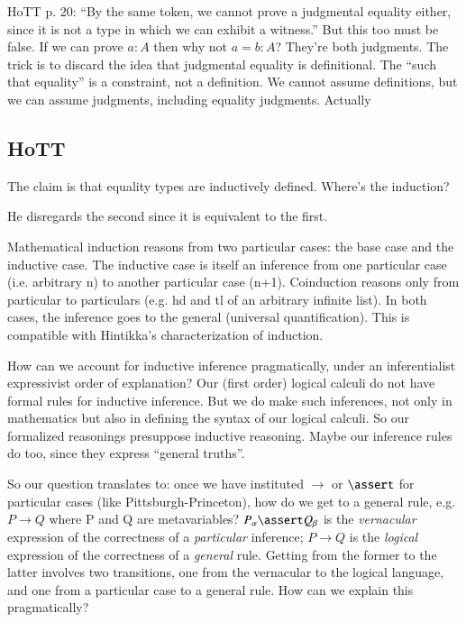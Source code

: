 HoTT p. 20: ``By the same token, we cannot prove a judgmental equality
either, since it is not a type in which we can exhibit a witness.''
But this too must be false. If we can prove \(a:A\) then why not
\(a=b:A\)? They're both judgments. The trick is to discard the idea
that judgmental equality is definitional. The ``such that equality''
is a constraint, not a definition. We cannot assume definitions, but
we can assume judgments, including equality judgments. Actually


\subsection{HoTT}

The claim is that equality types are inductively defined. Where's the
induction?


He disregards the second since it is equivalent to the first.

Mathematical induction reasons from two particular cases: the base
case and the inductive case. The inductive case is itself an inference
from one particular case (i.e. arbitrary n) to another particular case
(n+1). Coinduction reasons only from particular to particulars (e.g.
hd and tl of an arbitrary infinite list). In both cases, the inference
goes to the general (universal quantification). This is compatible
with Hintikka's characterization of induction.

How can we account for inductive inference pragmatically, under an
inferentialist expressivist order of explanation? Our (first order)
logical calculi do not have formal rules for inductive inference. But
we do make such inferences, not only in mathematics but also in
defining the syntax of our logical calculi. So our formalized
reasonings presuppose inductive reasoning. Maybe our inference rules
do too, since they express ``general truths''.

So our question translates to: once we have instituted \(\rightarrow\)
or \(\linfer\) for particular cases (like Pittsburgh-Princeton), how do
we get to a general rule, e.g. \(P\rightarrow Q\) where P and Q are
metavariables? \(P_{\alpha}\linfer Q_{\beta}\) is the
\textit{vernacular} expression of the correctness of a
\textit{particular} inference; \(P\rightarrow Q\) is the
\textit{logical} expression of the correctness of a \textit{general}
rule. Getting from the former to the latter involves two transitions,
one from the vernacular to the logical language, and one from a
particular case to a general rule. How can we explain this
pragmatically?


